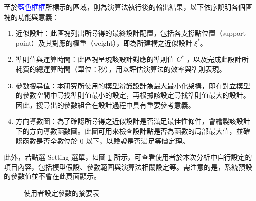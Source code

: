 至於\textcolor{blue}{藍色框框}所標示的區域，則為演算法執行後的輸出結果，以下依序說明各個區塊的功能與意義：

\begin{enumerate}
\item 近似設計：此區塊列出所尋得的最終設計配置，包括各支撐點位置（support point）及其對應的權重（weight），即為所建構之近似設計 $\xi^*$。

\item 準則值與運算時間：此區塊呈現該設計對應的準則值 $C^*$ ，以及完成此設計所耗費的總運算時間（單位：秒），用以評估演算法的效率與準則表現。

\item 參數搜尋值：本研究所使用的模型辨識設計為最大最小化架構，即在對立模型的參數空間中尋找準則值最小的設定，再根據該設定尋找準則值最大的設計。因此，搜尋出的參數組合在設計過程中具有重要參考意義。

\item 方向導數圖：為了確認所尋得之近似設計是否滿足最佳性條件，會繪製該設計下的方向導數函數圖。此圖可用來檢查設計點是否為函數的局部最大值，並確認函數是否全數位於 0 以下，以驗證是否滿足等價定理。
\end{enumerate}

此外，若點選 Setting 選單，如圖 \ref{fig:Fidalgo-shiny2} 所示，可查看使用者於本次分析中自行設定的項目內容，包括模型假設、參數範圍與演算法相關設定等。需注意的是，系統預設的參數值並不會在此頁面顯示。

\begin{figure}[H]
    \caption{使用者設定參數的摘要表}
    \label{fig:Fidalgo-shiny2}
\end{figure}

